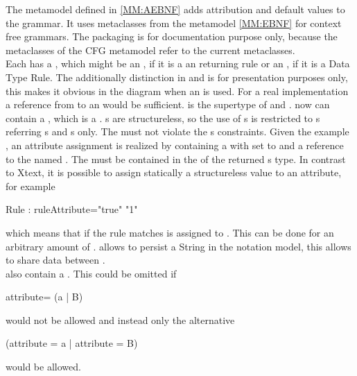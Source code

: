 The metamodel defined in \ref{MM:AEBNF} adds attribution and default values to the grammar. It uses metaclasses from the metamodel \ref{MM:EBNF} for context free grammars. The packaging is for documentation purpose only, because the metaclasses of the CFG metamodel refer to the current metaclasses. \\
Each  has a , which might be an , if it is a an  returning rule or an , if it is a Data Type Rule. The additionally distinction in  and  is for presentation purposes only, this makes it obvious in the diagram when an  is used. For a real implementation a reference from  to an  would be sufficient.  is the supertype of  and .  now can contain a  , which is a .  s are structureless, so the use of s is restricted to  s referring s and  s only. The   must not violate the  s constraints. Given the example , an attribute assignment is realized by  containing a   with  set to   and a reference to the   named . The  must be contained in the   of the returned s type. In contrast to Xtext, it is possible to assign statically a structureless value to an attribute, for example 
\begin{xtxt}
Rule : {ruleAttribute="true"} "1"
\end{xtxt}   
which means that if the rule matches  is assigned to . This can be done for an arbitrary amount of .  allows to persist a String in the notation model, this allows to share data between . \\
 also contain a . This could be omitted if 
\begin{xtxt}
attribute= (a | B)
\end{xtxt}
would not be allowed and instead only the alternative 
\begin{xtxt}
(attribute = a | attribute = B)
\end{xtxt}
would be allowed.
